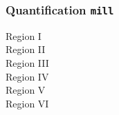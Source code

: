 \documentclass[compress]{beamer}
\begin{document}
\begin{frame}
	\frametitle{Quantification \texttt{mill}}
	
%	

Region I \\
Region II \\
Region III \\
Region IV \\
Region V \\
Region VI \\
	
\end{frame}
\end{document}
